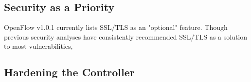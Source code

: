 \subsection{Security as a Priority}

OpenFlow v1.0.1 currently lists SSL/TLS as an "optional" feature. Though previous security analyses have consistently recommended SSL/TLS as a solution to most vulnerabilities, 

\subsection{Hardening the Controller}